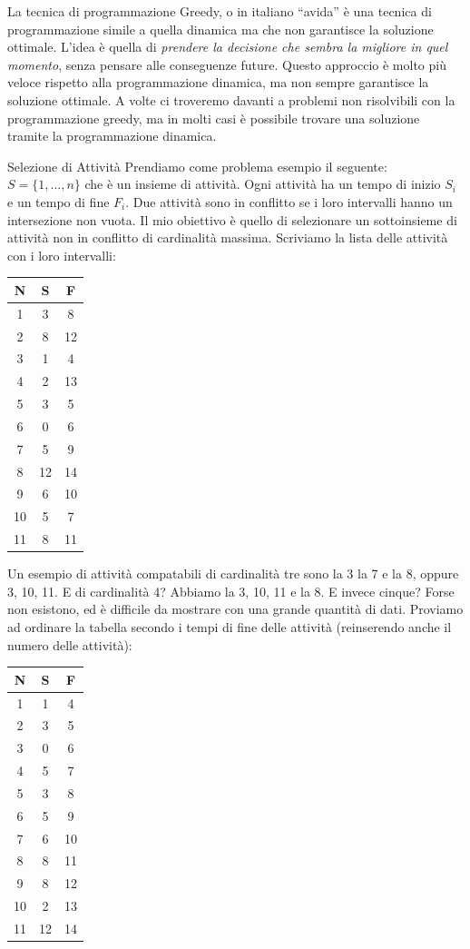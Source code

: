 \documentclass[a4paper]{article}
\begin{document}
La tecnica di programmazione Greedy, o in italiano \enquote{avida} è una tecnica di programmazione simile a quella dinamica 
ma che non garantisce la soluzione ottimale. L'idea è quella di \textit{prendere la decisione che sembra la migliore in quel momento}, senza 
pensare alle conseguenze future. Questo approccio è molto più veloce rispetto alla programmazione dinamica, ma non sempre garantisce
la soluzione ottimale. A volte ci troveremo davanti a problemi non risolvibili con la programmazione greedy, ma in molti casi
è possibile trovare una soluzione tramite la programmazione dinamica. 
\begin{examplebox}{Selezione di Attività}
  Prendiamo come problema esempio il seguente:
  $S = \{1, ... , n\}$ che è un insieme di attività. Ogni attività ha un tempo di inizio $S_i$ e un tempo di fine $F_i$. Due attività sono in conflitto
  se i loro intervalli hanno un intersezione non vuota. Il mio obiettivo è quello di selezionare un sottoinsieme di attività non in conflitto di cardinalità 
  massima. Scriviamo la lista delle attività con i loro intervalli:
\begin{center}
  

\begin{tabular}{c|c|c}
  N & S & F\\
  \hline
  1 & 3 & 8\\
  2 & 8 & 12\\
  3 & 1 & 4\\
  4 & 2 & 13\\
  5 & 3 & 5\\
  6 & 0 & 6\\
  7 & 5 & 9\\
  8 & 12 & 14\\
  9 & 6 & 10\\
  10 & 5 & 7\\
  11 & 8 & 11
\end{tabular}
\end{center}
\noindent
Un esempio di attività compatabili di cardinalità tre sono la 3 la 7 e la 8, oppure 3, 10, 11. E di cardinalità 4?
Abbiamo la 3, 10, 11 e la 8. E invece cinque? Forse non esistono, ed è difficile da mostrare con una grande quantità di dati.
Proviamo ad ordinare la tabella secondo i tempi di fine delle attività (reinserendo anche il numero delle attività):
\begin{center}
\begin{tabular}{c|c|c}
  N & S & F\\
  \hline
  1 & 1 & 4\\
  2 & 3 & 5\\
  3 & 0 & 6\\
  4 & 5 & 7\\
  5 & 3 & 8\\
  6 & 5 & 9\\
  7 & 6 & 10\\
  8 & 8 & 11\\
  9 & 8 & 12\\
  10 & 2 & 13\\
  11 & 12 & 14
\end{tabular}
\end{center}


\end{examplebox}
\end{document}
